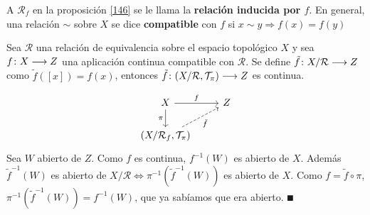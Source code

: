 \documentclass[GTS.tex]{subfiles}
\begin{document}
\vspace{1cm}

\begin{defi} A $\mathcal{R}_f$ en la proposición \ref{146} se le llama la \textbf{relación inducida por $f$}. En general, una relación $\sim$ sobre $X$ se dice \textbf{compatible} con $f$ si $x\sim y\Rightarrow f(x)=f(y)$
\end{defi}

\begin{prop}\label{149}
Sea $\mathcal{R}$ una relación de equivalencia sobre el espacio topológico $X$ y sea $f\colon{X}\longrightarrow{Z}$ una aplicación continua compatible con $\mathcal{R}$. Se define $\tilde{f}\colon{X/\mathcal{R}}\longrightarrow{Z}$ como $\tilde{f}([x])=f(x)$, entonces $\tilde{f}\colon{(X/\mathcal{R},\mathcal{T}_\pi)}\longrightarrow{Z}$ es continua.
\end{prop}
\begin{dem}
\[
\begin{tikzcd}
X \ar[r, "f"]\arrow[d,"\pi "'] & Z\\
\left(X/\mathcal{R}_f,\Tau_\pi\right) \arrow[ur, dashrightarrow, "\tilde{f} "']
\end{tikzcd}
\]
Sea $W$ abierto de $Z$. Como $f$ es continua, $f^{-1}(W)$ es abierto de $X$. Además $\tilde{f}^{-1}(W)$ es abierto de $X/\mathcal{R}\Leftrightarrow\pi^{-1}(\tilde{f}^{-1}(W))$ es abierto de $X$. Como $f=\tilde{f}\circ\pi$, $\pi^{-1}(\tilde{f}^{-1}(W))=f^{-1}(W)$, que ya sabíamos que era abierto. $\QED$
\end{dem}
\end{document}
